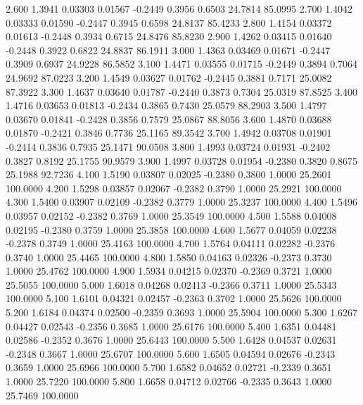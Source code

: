    2.600   1.3941   0.03303   0.01567  -0.2449   0.3956   0.6503  24.7814  85.0995
   2.700   1.4042   0.03333   0.01590  -0.2447   0.3945   0.6598  24.8137  85.4233
   2.800   1.4154   0.03372   0.01613  -0.2448   0.3934   0.6715  24.8476  85.8230
   2.900   1.4262   0.03415   0.01640  -0.2448   0.3922   0.6822  24.8837  86.1911
   3.000   1.4363   0.03469   0.01671  -0.2447   0.3909   0.6937  24.9228  86.5852
   3.100   1.4471   0.03555   0.01715  -0.2449   0.3894   0.7064  24.9692  87.0223
   3.200   1.4549   0.03627   0.01762  -0.2445   0.3881   0.7171  25.0082  87.3922
   3.300   1.4637   0.03640   0.01787  -0.2440   0.3873   0.7304  25.0319  87.8525
   3.400   1.4716   0.03653   0.01813  -0.2434   0.3865   0.7430  25.0579  88.2903
   3.500   1.4797   0.03670   0.01841  -0.2428   0.3856   0.7579  25.0867  88.8056
   3.600   1.4870   0.03688   0.01870  -0.2421   0.3846   0.7736  25.1165  89.3542
   3.700   1.4942   0.03708   0.01901  -0.2414   0.3836   0.7935  25.1471  90.0508
   3.800   1.4993   0.03724   0.01931  -0.2402   0.3827   0.8192  25.1755  90.9579
   3.900   1.4997   0.03728   0.01954  -0.2380   0.3820   0.8675  25.1988  92.7236
   4.100   1.5190   0.03807   0.02025  -0.2380   0.3800   1.0000  25.2601 100.0000
   4.200   1.5298   0.03857   0.02067  -0.2382   0.3790   1.0000  25.2921 100.0000
   4.300   1.5400   0.03907   0.02109  -0.2382   0.3779   1.0000  25.3237 100.0000
   4.400   1.5496   0.03957   0.02152  -0.2382   0.3769   1.0000  25.3549 100.0000
   4.500   1.5588   0.04008   0.02195  -0.2380   0.3759   1.0000  25.3858 100.0000
   4.600   1.5677   0.04059   0.02238  -0.2378   0.3749   1.0000  25.4163 100.0000
   4.700   1.5764   0.04111   0.02282  -0.2376   0.3740   1.0000  25.4465 100.0000
   4.800   1.5850   0.04163   0.02326  -0.2373   0.3730   1.0000  25.4762 100.0000
   4.900   1.5934   0.04215   0.02370  -0.2369   0.3721   1.0000  25.5055 100.0000
   5.000   1.6018   0.04268   0.02413  -0.2366   0.3711   1.0000  25.5343 100.0000
   5.100   1.6101   0.04321   0.02457  -0.2363   0.3702   1.0000  25.5626 100.0000
   5.200   1.6184   0.04374   0.02500  -0.2359   0.3693   1.0000  25.5904 100.0000
   5.300   1.6267   0.04427   0.02543  -0.2356   0.3685   1.0000  25.6176 100.0000
   5.400   1.6351   0.04481   0.02586  -0.2352   0.3676   1.0000  25.6443 100.0000
   5.500   1.6428   0.04537   0.02631  -0.2348   0.3667   1.0000  25.6707 100.0000
   5.600   1.6505   0.04594   0.02676  -0.2343   0.3659   1.0000  25.6966 100.0000
   5.700   1.6582   0.04652   0.02721  -0.2339   0.3651   1.0000  25.7220 100.0000
   5.800   1.6658   0.04712   0.02766  -0.2335   0.3643   1.0000  25.7469 100.0000

